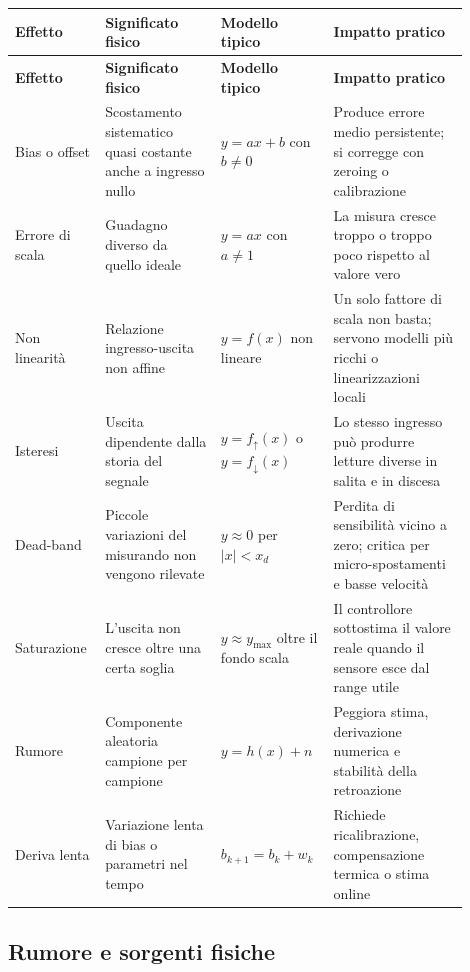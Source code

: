 \documentclass[11pt,a4paper]{article}
\begin{document}
{\renewcommand{\arraystretch}{1.18}
\begin{longtable}{@{}>{\raggedright\arraybackslash}p{0.16\linewidth}>{\raggedright\arraybackslash}p{0.24\linewidth}>{\raggedright\arraybackslash}p{0.22\linewidth}>{\raggedright\arraybackslash}p{0.28\linewidth}@{}}
\toprule
\textbf{Effetto} & \textbf{Significato fisico} & \textbf{Modello tipico} & \textbf{Impatto pratico} \\
\midrule
\endfirsthead
\toprule
\textbf{Effetto} & \textbf{Significato fisico} & \textbf{Modello tipico} & \textbf{Impatto pratico} \\
\midrule
\endhead
Bias o offset & Scostamento sistematico quasi costante anche a ingresso nullo & $y=ax+b$ con $b\neq 0$ & Produce errore medio persistente; si corregge con zeroing o calibrazione \\
Errore di scala & Guadagno diverso da quello ideale & $y=ax$ con $a\neq 1$ & La misura cresce troppo o troppo poco rispetto al valore vero \\
Non linearit\`a & Relazione ingresso-uscita non affine & $y=f(x)$ non lineare & Un solo fattore di scala non basta; servono modelli pi\`u ricchi o linearizzazioni locali \\
Isteresi & Uscita dipendente dalla storia del segnale & $y=f_{\uparrow}(x)$ o $y=f_{\downarrow}(x)$ & Lo stesso ingresso pu\`o produrre letture diverse in salita e in discesa \\
Dead-band & Piccole variazioni del misurando non vengono rilevate & $y\approx 0$ per $|x|<x_d$ & Perdita di sensibilit\`a vicino a zero; critica per micro-spostamenti e basse velocit\`a \\
Saturazione & L’uscita non cresce oltre una certa soglia & $y\approx y_{\max}$ oltre il fondo scala & Il controllore sottostima il valore reale quando il sensore esce dal range utile \\
Rumore & Componente aleatoria campione per campione & $y=h(x)+n$ & Peggiora stima, derivazione numerica e stabilit\`a della retroazione \\
Deriva lenta & Variazione lenta di bias o parametri nel tempo & $b_{k+1}=b_k+w_k$ & Richiede ricalibrazione, compensazione termica o stima online \\
\bottomrule
\end{longtable}
}

\subsection{Rumore e sorgenti fisiche}
\end{document}
